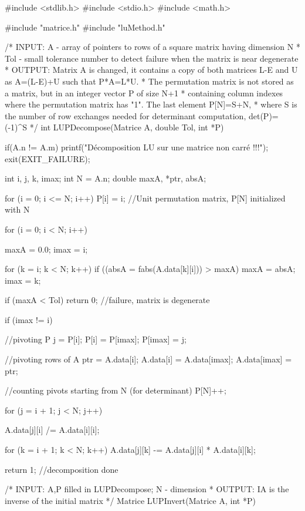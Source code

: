 \documentclass[12pt]{article}
\begin{document}
\begin{C}
#include <stdlib.h>
#include <stdio.h>
#include <math.h>

#include "matrice.h"
#include "luMethod.h"

/* INPUT: A - array of pointers to rows of a square matrix having dimension N
 *        Tol - small tolerance number to detect failure when the matrix is near degenerate
 * OUTPUT: Matrix A is changed, it contains a copy of both matrices L-E and U as A=(L-E)+U such that P*A=L*U.
 *        The permutation matrix is not stored as a matrix, but in an integer vector P of size N+1
 *        containing column indexes where the permutation matrix has "1". The last element P[N]=S+N,
 *        where S is the number of row exchanges needed for determinant computation, det(P)=(-1)^S
 */
int LUPDecompose(Matrice A, double Tol, int *P) {
    if(A.n != A.m)
    {
        printf("Décomposition LU sur une matrice non carré !!!\n");
        exit(EXIT_FAILURE);
    }

    int i, j, k, imax;
    int N = A.n;
    double maxA, *ptr, absA;

    for (i = 0; i <= N; i++)
        P[i] = i; //Unit permutation matrix, P[N] initialized with N

    for (i = 0; i < N; i++) {
        maxA = 0.0;
        imax = i;

        for (k = i; k < N; k++)
            if ((absA = fabs(A.data[k][i])) > maxA) {
                maxA = absA;
                imax = k;
            }

        if (maxA < Tol) return 0; //failure, matrix is degenerate

        if (imax != i) {
            //pivoting P
            j = P[i];
            P[i] = P[imax];
            P[imax] = j;

            //pivoting rows of A
            ptr = A.data[i];
            A.data[i] = A.data[imax];
            A.data[imax] = ptr;

            //counting pivots starting from N (for determinant)
            P[N]++;
        }

        for (j = i + 1; j < N; j++) {
            A.data[j][i] /= A.data[i][i];

            for (k = i + 1; k < N; k++)
                A.data[j][k] -= A.data[j][i] * A.data[i][k];
        }
    }
    
    return 1;  //decomposition done
}


/* INPUT: A,P filled in LUPDecompose; N - dimension
 * OUTPUT: IA is the inverse of the initial matrix
 */
Matrice LUPInvert(Matrice A, int *P) {
    
}
\end{C}
\end{document}
